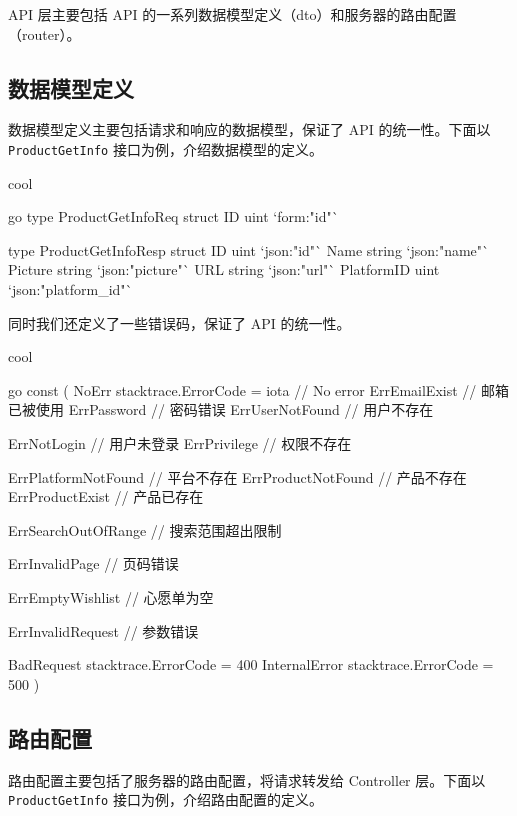 API 层主要包括 API 的一系列数据模型定义（dto）和服务器的路由配置（router）。

\subsection{数据模型定义}

数据模型定义主要包括请求和响应的数据模型，保证了 API 的统一性。下面以 \texttt{ProductGetInfo} 接口为例，介绍数据模型的定义。

\begin{codebox}{}{cool}
\begin{amzcode}{go}
type ProductGetInfoReq struct {
	ID uint `form:"id"`
}

type ProductGetInfoResp struct {
	ID         uint   `json:"id"`
	Name       string `json:"name"`
	Picture    string `json:"picture"`
	URL        string `json:"url"`
	PlatformID uint   `json:"platform_id"`
}
\end{amzcode}
\end{codebox}

同时我们还定义了一些错误码，保证了 API 的统一性。

\begin{codebox}{}{cool}
\begin{amzcode}{go}
const (
	NoErr           stacktrace.ErrorCode = iota // No error
	ErrEmailExist                               // 邮箱已被使用
	ErrPassword                                 // 密码错误
	ErrUserNotFound                             // 用户不存在

	ErrNotLogin  // 用户未登录
	ErrPrivilege // 权限不存在

	ErrPlatformNotFound // 平台不存在
	ErrProductNotFound  // 产品不存在
	ErrProductExist     // 产品已存在

	ErrSearchOutOfRange // 搜索范围超出限制

	ErrInvalidPage // 页码错误

	ErrEmptyWishlist // 心愿单为空

	ErrInvalidRequest // 参数错误

	BadRequest    stacktrace.ErrorCode = 400
	InternalError stacktrace.ErrorCode = 500
)
\end{amzcode}
\end{codebox}

\subsection{路由配置}

路由配置主要包括了服务器的路由配置，将请求转发给 Controller 层。下面以 \texttt{ProductGetInfo} 接口为例，介绍路由配置的定义。


